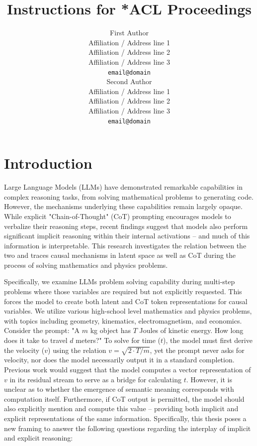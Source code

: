 \documentclass[11pt]{article}
\title{Instructions for *ACL Proceedings}
\author{First Author \\
  Affiliation / Address line 1 \\
  Affiliation / Address line 2 \\
  Affiliation / Address line 3 \\
  \texttt{email@domain} \\\And
  Second Author \\
  Affiliation / Address line 1 \\
  Affiliation / Address line 2 \\
  Affiliation / Address line 3 \\
  \texttt{email@domain} \\}
\begin{document}
\maketitle
\begin{abstract}

\end{abstract}

\section{Introduction}

Large Language Models (LLMs) have demonstrated remarkable capabilities in complex reasoning tasks, from solving mathematical problems to generating code. However, the mechanisms underlying these capabilities remain largely opaque. While explicit "Chain-of-Thought" (CoT) prompting encourages models to verbalize their reasoning steps, recent findings suggest that models also perform significant implicit reasoning within their internal activations -- and much of this information is interpretable. This research investigates the relation between the two and traces causal mechanisms in latent space as well as CoT during the process of solving mathematics and physics problems. 

Specifically, we examine LLMs problem solving capability during multi-step problems where those variables are required but not explicitly requested. This forces the model to create both latent and CoT token representations for causal variables. We utilize various high-school level mathematics and physics problems, with topics including geometry, kinematics, electromagnetism, and economics.  Consider the prompt: "A $m$ kg object has $T$ Joules of kinetic energy. How long does it take to travel $d$ meters?" To solve for time ($t$), the model must first derive the velocity ($v$) using the relation $v = \sqrt{2 \cdot T / m}$, yet the prompt never asks for velocity, nor does the model necessarily output it in a standard completion. Previous work would suggest that the model computes a vector representation of $v$ in its residual stream to serve as a bridge for calculating $t$. However, it is unclear as to whether the emergence of semantic meaning corresponds with computation itself. Furthermore, if CoT output is permitted, the model should also explicitly mention and compute this value -- providing both implicit and explicit representations of the same information. Specifically, this thesis poses a new framing to answer the following questions regarding the interplay of implicit and explicit reasoning:
\end{document}
